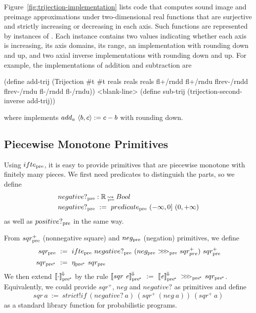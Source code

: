 Figure~\ref{fig:trijection-implementation} lists code that computes sound image and preimage approximations under two-dimensional real functions that are surjective and strictly increasing or decreasing in each axis.
Such functions are represented by instances of .
Each instance contains two  values indicating whether each axis is increasing, its axis domains, its range, an implementation with rounding down and up, and two axial inverse implementations with rounding down and up.
For example, the implementations of addition and subtraction are
\begin{center}\singlespacing
\begin{schemedisplay}
(define add-trij
  (Trijection #t #t reals reals reals
              fl+/rndd fl+/rndu
              flrev-/rndd flrev-/rndu
              fl-/rndd fl-/rndu))
<blank-line>
(define sub-trij
  (trijection-second-inverse add-trij))
\end{schemedisplay}
\end{center}
where  implements $add_a~\langle{b,c}\rangle := c - b$ with rounding down.

\subsection{Piecewise Monotone Primitives}
\label{sec:piecewise-monotone-primitives}

Using $ifte_\mathrm{pre}$, it is easy to provide primitives that are piecewise monotone with finitely many pieces.
We first need predicates to distinguish the parts, so we define
\begin{equation}
\begin{aligned}
	&negative?_\mathrm{pre} : \mathbb{R} \operatorname{\rightsquigarrow_{\mspace{-20mu}_\mathrm{pre}}} Bool \\
	&negative?_\mathrm{pre}\ :=\ predicate_\mathrm{pre}~(-\infty,0]~(0,+\infty)
\end{aligned}
\end{equation}
as well as $positive?_\mathrm{pre}$ in the same way.

From $sqr^+_\mathrm{pre}$ (nonnegative square) and $neg_\mathrm{pre}$ (negation) primitives, we define
\begin{equation}
\begin{aligned}
	sqr\pre&\ :=\ \ifpre~negative?\pre~(neg\pre~\comppre~sqr^+_{pre})~sqr^+\pre
\\
	sqr\ppre&\ :=\ \eta\ppre~sqr\pre
\end{aligned}
\end{equation}
We then extend $\left\llbracket{\cdot}\right\rrbracket^{\mspace{-2mu}\Downarrow\mspace{-2mu}}_\mathrm{pre^{\mspace{-2mu}*}}$ by the rule $\meaningofconv{sqr~\mathit{e}}\ppre\ :=\ \meaningofconv{\mathit{e}}\ppre~\compppre~sqr\ppre$.
Equivalently, we could provide $sqr^+$, $neg$ and $negative?$ as primitives and define
\begin{equation}
	sqr~a\ :=\ strict!if~(negative?~a)~(sqr^+~(neg~a))~(sqr^+~a)
\end{equation}
as a standard library function for probabilistic programs.

